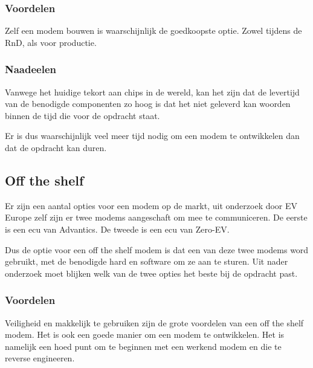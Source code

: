 \subsubsection{Voordelen}

Zelf een modem bouwen is waarschijnlijk de goedkoopste optie. Zowel tijdens de
RnD, als voor productie.

\subsubsection{Naadeelen}

Vanwege het huidige tekort aan chips in de wereld, kan het zijn dat de
levertijd van de benodigde componenten zo hoog is dat het niet geleverd
kan woorden binnen de tijd die voor de opdracht staat. 

Er is dus waarschijnlijk veel meer tijd nodig om een modem te ontwikkelen dan
dat de opdracht kan duren.

\subsection{Off the shelf}

Er zijn een aantal opties voor een modem op de markt, uit onderzoek door EV
Europe zelf zijn er twee modems aangeschaft om mee te communiceren. De eerste
is een \ac{ecu} van Advantics. De tweede is een \ac{ecu} van Zero-EV.

Dus de optie voor een off the shelf modem is dat een van deze twee modems word
gebruikt, met de benodigde hard en software om ze aan te sturen. Uit nader
onderzoek moet blijken welk van de twee opties het beste bij de opdracht past.

\subsubsection{Voordelen}

Veiligheid en makkelijk te gebruiken zijn de grote voordelen van een off the
shelf modem. Het is ook een goede manier om een modem te ontwikkelen. Het is
namelijk een hoed punt om te beginnen met een werkend modem en die te reverse
engineeren.

